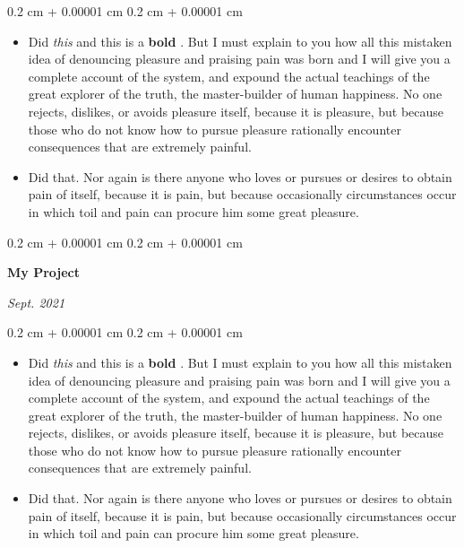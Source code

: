 \documentclass[10pt, letterpaper]{article}
\newenvironment{highlights}{
    \begin{itemize}[
        topsep=0.10 cm,
        parsep=0.10 cm,
        partopsep=0pt,
        itemsep=0pt,
        leftmargin=0.4 cm + 10pt + 0.6 cm
    ]
}{
    \end{itemize}
} %
\newenvironment{onecolentry}{
    \begin{adjustwidth}{
        0.2 cm + 0.00001 cm
    }{
        0.2 cm + 0.00001 cm
    }
}{
    \end{adjustwidth}
} %
\newenvironment{threecolentry}[3][]{
    \onecolentry
    \def\thirdColumn{#3}
    \setcolumnwidth{0.6 cm, \fill, 4.5 cm}
    \begin{paracol}{3}
    #2 \switchcolumn
}{
    \switchcolumn \raggedleft \thirdColumn
    \end{paracol}
    \endonecolentry
} %
\let\hrefWithoutArrow\href
\renewcommand{\href}[2]{\hrefWithoutArrow{#1}{\mbox{\ifthenelse{\equal{#2}{}}{ }{#2 }\raisebox{.15ex}{\footnotesize \faExternalLink*}}}}
\begin{document}
        \vspace{0.10 cm-3px}
        \begin{onecolentry}
            \begin{highlights}
                \item Did \textit{this} and this is a \textbf{bold} \href{https://example.com}{link}. But I must explain to you how all this mistaken idea of denouncing pleasure and praising pain was born and I will give you a complete account of the system, and expound the actual teachings of the great explorer of the truth, the master-builder of human happiness. No one rejects, dislikes, or avoids pleasure itself, because it is pleasure, but because those who do not know how to pursue pleasure rationally encounter consequences that are extremely painful.
                \item Did that. Nor again is there anyone who loves or pursues or desires to obtain pain of itself, because it is pain, but because occasionally circumstances occur in which toil and pain can procure him some great pleasure.
            \end{highlights}
        \end{onecolentry}


        \vspace{0.2 cm-3px}

        \begin{threecolentry}{
            \vspace*{\fill}
            \textbullet
            \vspace*{3px}
            \vspace*{\fill}
        }{
            
            
        \textit{Sept. 2021}}
            \textbf{My Project}
        \end{threecolentry}

        \vspace{0.10 cm-3px}
        \begin{onecolentry}
            \begin{highlights}
                \item Did \textit{this} and this is a \textbf{bold} \href{https://example.com}{link}. But I must explain to you how all this mistaken idea of denouncing pleasure and praising pain was born and I will give you a complete account of the system, and expound the actual teachings of the great explorer of the truth, the master-builder of human happiness. No one rejects, dislikes, or avoids pleasure itself, because it is pleasure, but because those who do not know how to pursue pleasure rationally encounter consequences that are extremely painful.
                \item Did that. Nor again is there anyone who loves or pursues or desires to obtain pain of itself, because it is pain, but because occasionally circumstances occur in which toil and pain can procure him some great pleasure.
            \end{highlights}
        \end{onecolentry}
\end{document}
